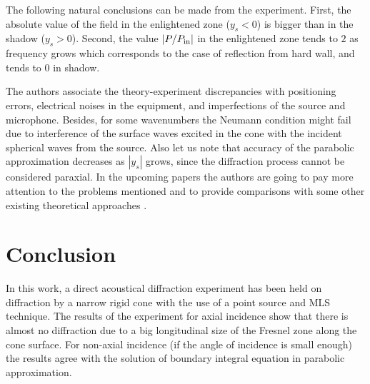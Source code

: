 \documentclass{procDDs}
\begin{document}
The following natural conclusions can be made from the experiment. First, the absolute value of the field in the enlightened zone ($y_s < 0$) is bigger than in the shadow ($y_s > 0$). Second, the  value $|P/P_{\rm in}|$ in the enlightened zone tends to $2$ as frequency grows which corresponds to the case of reflection from hard wall, and tends to $0$ in shadow. 

The authors associate the theory-experiment discrepancies with positioning errors, electrical noises in the equipment, and imperfections of the source and microphone. Besides, for some wavenumbers the Neumann condition might fail due to interference of the surface waves excited in the cone with the incident spherical waves from the source. Also let us note that accuracy of the parabolic approximation decreases as $|y_s|$ grows, since the diffraction process cannot be considered paraxial. In the upcoming papers the authors are going to pay more attention to the problems mentioned and to provide comparisons with some other existing theoretical approaches \cite{Popov,Andronov,Smychlyaev,Lyalinov,babich1996}.     




\section{Conclusion}

In this work, a direct  acoustical diffraction experiment has been held on diffraction by a narrow rigid cone with the use of a point source and MLS technique. The results of the experiment for axial incidence show that there is almost no diffraction due to a big longitudinal size of the Fresnel zone along the cone surface. For non-axial incidence (if the angle of incidence is small enough) the results agree with the solution of boundary integral equation in parabolic approximation.
 
\end{document}
